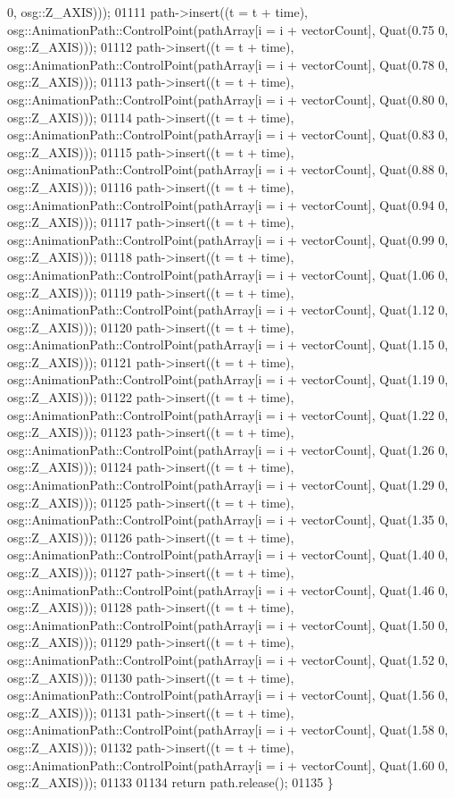 \begin{DoxyCode}
      0, osg::Z\_AXIS)));
01111     path->insert((t = t + time), osg::AnimationPath::ControlPoint(pathArray[i = i + vectorCount], Quat(0.75
      0, osg::Z\_AXIS)));
01112     path->insert((t = t + time), osg::AnimationPath::ControlPoint(pathArray[i = i + vectorCount], Quat(0.78
      0, osg::Z\_AXIS)));
01113     path->insert((t = t + time), osg::AnimationPath::ControlPoint(pathArray[i = i + vectorCount], Quat(0.80
      0, osg::Z\_AXIS)));
01114     path->insert((t = t + time), osg::AnimationPath::ControlPoint(pathArray[i = i + vectorCount], Quat(0.83
      0, osg::Z\_AXIS)));
01115     path->insert((t = t + time), osg::AnimationPath::ControlPoint(pathArray[i = i + vectorCount], Quat(0.88
      0, osg::Z\_AXIS)));
01116     path->insert((t = t + time), osg::AnimationPath::ControlPoint(pathArray[i = i + vectorCount], Quat(0.94
      0, osg::Z\_AXIS)));
01117     path->insert((t = t + time), osg::AnimationPath::ControlPoint(pathArray[i = i + vectorCount], Quat(0.99
      0, osg::Z\_AXIS)));
01118     path->insert((t = t + time), osg::AnimationPath::ControlPoint(pathArray[i = i + vectorCount], Quat(1.06
      0, osg::Z\_AXIS)));
01119     path->insert((t = t + time), osg::AnimationPath::ControlPoint(pathArray[i = i + vectorCount], Quat(1.12
      0, osg::Z\_AXIS)));
01120     path->insert((t = t + time), osg::AnimationPath::ControlPoint(pathArray[i = i + vectorCount], Quat(1.15
      0, osg::Z\_AXIS)));
01121     path->insert((t = t + time), osg::AnimationPath::ControlPoint(pathArray[i = i + vectorCount], Quat(1.19
      0, osg::Z\_AXIS)));
01122     path->insert((t = t + time), osg::AnimationPath::ControlPoint(pathArray[i = i + vectorCount], Quat(1.22
      0, osg::Z\_AXIS)));
01123     path->insert((t = t + time), osg::AnimationPath::ControlPoint(pathArray[i = i + vectorCount], Quat(1.26
      0, osg::Z\_AXIS)));
01124     path->insert((t = t + time), osg::AnimationPath::ControlPoint(pathArray[i = i + vectorCount], Quat(1.29
      0, osg::Z\_AXIS)));
01125     path->insert((t = t + time), osg::AnimationPath::ControlPoint(pathArray[i = i + vectorCount], Quat(1.35
      0, osg::Z\_AXIS)));
01126     path->insert((t = t + time), osg::AnimationPath::ControlPoint(pathArray[i = i + vectorCount], Quat(1.40
      0, osg::Z\_AXIS)));
01127     path->insert((t = t + time), osg::AnimationPath::ControlPoint(pathArray[i = i + vectorCount], Quat(1.46
      0, osg::Z\_AXIS)));
01128     path->insert((t = t + time), osg::AnimationPath::ControlPoint(pathArray[i = i + vectorCount], Quat(1.50
      0, osg::Z\_AXIS)));
01129     path->insert((t = t + time), osg::AnimationPath::ControlPoint(pathArray[i = i + vectorCount], Quat(1.52
      0, osg::Z\_AXIS)));
01130     path->insert((t = t + time), osg::AnimationPath::ControlPoint(pathArray[i = i + vectorCount], Quat(1.56
      0, osg::Z\_AXIS)));
01131     path->insert((t = t + time), osg::AnimationPath::ControlPoint(pathArray[i = i + vectorCount], Quat(1.58
      0, osg::Z\_AXIS)));
01132     path->insert((t = t + time), osg::AnimationPath::ControlPoint(pathArray[i = i + vectorCount], Quat(1.60
      0, osg::Z\_AXIS)));
01133     
01134     \textcolor{keywordflow}{return} path.release();
01135 \}
\end{DoxyCode}
